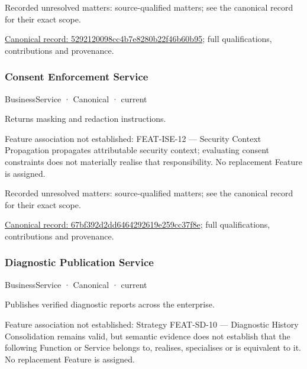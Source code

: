 {\small Recorded unresolved matters: source-qualified matters; see the canonical record for their exact scope.}\par
{\footnotesize \href{../../../../continuum/business/business-service/5292120098cc4b7e8280b22f46b60b95.md}{Canonical record: 5292120098cc4b7e8280b22f46b60b95}; full qualifications, contributions and provenance.}\par
\subsubsection{Consent Enforcement Service}

\label{element:67bf392d2dd6464292619e259cc37f8e}
{\small BusinessService · Canonical · current}\par

Returns masking and redaction instructions.



Feature association not established: FEAT-ISE-12 — Security Context Propagation propagates attributable security context; evaluating consent constraints does not materially realise that responsibility. No replacement Feature is assigned.


{\small Recorded unresolved matters: source-qualified matters; see the canonical record for their exact scope.}\par
{\footnotesize \href{../../../../continuum/business/business-service/67bf392d2dd6464292619e259cc37f8e.md}{Canonical record: 67bf392d2dd6464292619e259cc37f8e}; full qualifications, contributions and provenance.}\par
\subsubsection{Diagnostic Publication Service}

\label{element:600ca5384b4643b0b35579a02c307dcf}
{\small BusinessService · Canonical · current}\par

Publishes verified diagnostic reports across the enterprise.



Feature association not established: Strategy FEAT-SD-10 — Diagnostic History Consolidation remains valid, but semantic evidence does not establish that the following Function or Service belongs to, realises, specialises or is equivalent to it. No replacement Feature is assigned.


